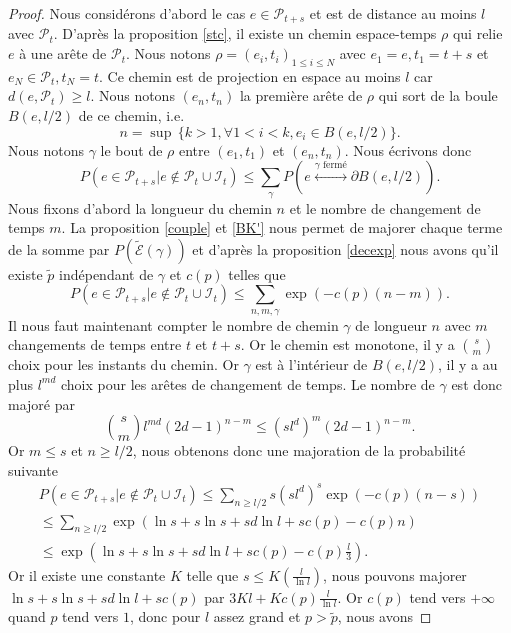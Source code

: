 \documentclass[titlepage,a4paper,12pt]{article}
\newcounter{prop}
\begin{document}
\begin{proof}
Nous considérons d'abord le cas $e\in \mathcal{P}_{t+s}$ et est de distance au moins $l$ avec $\mathcal{P}_t$.
D'après la proposition \ref{stc}, il existe un chemin espace-temps $\rho$ qui relie $e$ à une arête de $\mathcal{P}_t$. Nous notons $\rho= (e_i,t_i)_{1\leqslant i \leqslant N}$ avec $e_1 = e, t_1 = t+s$ et $e_N\in \mathcal{P}_t, t_N = t$. Ce chemin est de projection en espace au moins $l$ car $d(e,\mathcal{P}_t)\geqslant l$. Nous notons $(e_n,t_n)$ la première arête de $\rho$ qui sort de la boule $B(e,l/2)$ de ce chemin, i.e. 
$$ n = \sup\,\big\{k>1, \forall 1<i<k, e_i\in B(e,l/2) \big\}.
$$
Nous notons $\gamma$ le bout de $\rho$ entre $(e_1,t_1)$ et $(e_n,t_n)$.
Nous écrivons donc 
$$ P(e\in \mathcal{P}_{t+s}|e\notin \mathcal{P}_t\cup \mathcal{I}_t) \leqslant \sum_{\gamma}P( e\overset{\gamma \text{ fermé}}{\longleftrightarrow} \partial B(e,l/2)).
$$
Nous fixons d'abord la longueur du chemin $n$ et le nombre de changement de temps $m$. La proposition \ref{couple} et \ref{BK'} nous permet de majorer chaque terme de la somme par $P(\tilde{\mathcal{E}}(\gamma))$ et d'après la proposition \ref{decexp} nous avons qu'il existe $\tilde{p}$ indépendant de $\gamma$ et $c(p)$ telles que 
$$P(e\in \mathcal{P}_{t+s}|e\notin \mathcal{P}_t\cup \mathcal{I}_t) \leqslant \sum_{n,m,\gamma} \exp(-c(p)(n-m)).
$$
Il nous faut maintenant compter le nombre de chemin $\gamma$ de longueur $n$ avec $m$ changements de temps entre $t$ et $t+s$. Or le chemin est monotone, il y a $\displaystyle s \choose m$ choix pour les instants du chemin. Or $\gamma$ est à l'intérieur de $B(e,l/2)$, il y a au plus $l^{md}$ choix pour les arêtes de changement de temps. Le nombre de $\gamma$ est donc majoré par
$$ {s\choose m} l^{md} (2d-1)^{n-m}\leqslant (sl^d)^m(2d-1)^{n-m}.
$$
Or $m\leqslant s$ et $n\geqslant l/2$, nous obtenons donc une majoration de la probabilité suivante
\begin{multline*}P(e\in \mathcal{P}_{t+s}|e\notin \mathcal{P}_t\cup \mathcal{I}_t) \leqslant \sum_{n\geqslant l/2}s(sl^d)^s\exp(-c(p)(n-s))\\\leqslant \sum_{n\geqslant l/2} \exp(\ln s+s\ln s+sd\ln l +sc(p)-c(p)n)
\\ \leqslant \exp(\ln s+s\ln s+sd\ln l +sc(p) -c(p)\frac{l}{3}).
\end{multline*}
Or il existe une constante $K$ telle que $\displaystyle s \leqslant K(\frac{l}{\ln l})$, nous pouvons majorer $\ln s+s\ln s+sd\ln l +sc(p)$ par $\displaystyle 3Kl+Kc(p)\frac{l}{\ln l}$. Or $c(p)$ tend vers $+\infty$ quand $p$ tend vers $1$, donc pour $l$ assez grand et $p>\tilde{p}$, nous avons 

\end{proof}
\end{document}
